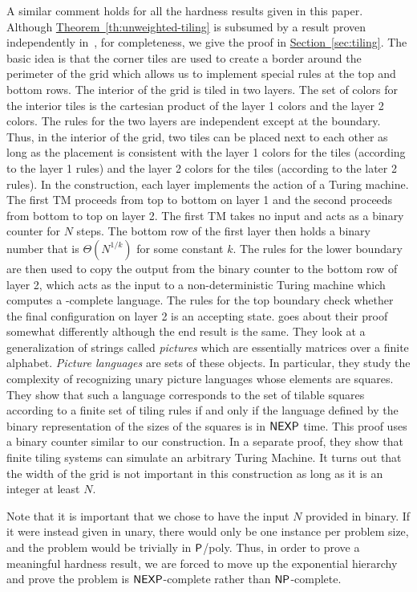\documentclass[10pt]{article}
\theoremstyle{definition}
\numberwithin{equation}{section}
\newcommand{\expref}[2]{\texorpdfstring{\hyperref[#2]{#1~\ref{#2}}}{#1~\ref{#2}}}
\newcommand{\NEXP}{{\sf{NEXP}}}
\newcommand{\Pclass}{{\sf{P}}}
\newcommand{\NP}{{\sf{NP}}}
\begin{document}
A similar comment holds for all the hardness results given in this paper.
Although \expref{Theorem}{th:unweighted-tiling} is subsumed by a result proven
independently in~\cite{BGL09}, for completeness,
we give the proof in \expref{Section}{sec:tiling}. The basic idea is that the
corner tiles are used to create a border around the perimeter of the grid which
allows us to implement special rules at the top and bottom rows.
The interior of the grid is tiled in two layers.
The set of colors for the interior tiles is the cartesian product of the
layer 1 colors and the layer 2 colors.
The rules for the two layers are independent except at the boundary.
Thus, in the interior of the grid, two tiles can be placed next to each
other as long as the placement is consistent with  the layer 1 colors for
the tiles (according to the layer 1 rules) and the layer 2 colors for the tiles
(according to the later 2 rules).
In the construction, each layer implements
the action of a Turing machine.
The first TM proceeds from top to bottom
on layer 1 and the second proceeds from bottom to top on layer 2.
The first TM takes no input and acts
as a binary counter for $N$ steps. The bottom row
of  the first layer then
holds a binary number that is $\Theta(N^{1/k})$ for some constant $k$.
The rules for the lower boundary are then used
to copy the output from the binary counter to the bottom row of layer 2, which
acts as the input to a non-deterministic Turing machine which computes a \NEXP-complete
language.
The rules for the top boundary check whether
the final configuration on layer 2 is an accepting  state.
\cite{BGL09} goes about their proof somewhat differently although the end result is the
same. They look at a generalization of strings called \emph{pictures} which are essentially matrices
over a finite alphabet. \emph{Picture languages} are sets of these objects.
In particular, they study the complexity of recognizing unary picture languages
whose elements are squares.
They show that such a language corresponds to the set of tilable squares according to a finite
set of tiling rules if and only if the language defined by the binary representation
of the sizes of the squares is in $\NEXP$ time. This proof uses a binary counter similar to our
construction. In a separate proof, they show that finite tiling systems can
simulate an arbitrary Turing Machine.
It turns out that the width of the grid is not important in this
construction as long as it is an integer
at least $N$.

Note that it is important that we chose to have the input $N$ provided in binary.
If it were instead given in unary, there would only be one instance per problem size,
and the problem would be trivially in $\Pclass$/poly.  Thus, in order to prove
a meaningful hardness result, we are forced to move up the exponential hierarchy
and prove the problem is $\NEXP$-complete rather than $\NP$-complete.
\setcounter{section}{2}\setcounter{table}{1}
\end{document}
